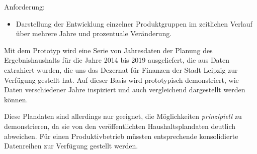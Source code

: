 \documentclass[11pt,a4paper,twoside]{article}
\begin{document}
Anforderung:
\begin{itemize}\itemsep0pt
\item Darstellung der Entwicklung einzelner Produktgruppen im zeitlichen
  Verlauf über mehrere Jahre und prozentuale Veränderung. 
\end{itemize}

Mit dem Prototyp wird eine Serie von Jahresdaten der Planung des
Ergebnishaushalts für die Jahre 2014 bis 2019 ausgeliefert, die aus Daten
extrahiert wurden, die uns das Dezernat für Finanzen der Stadt Leipzig zur
Verfügung gestellt hat.  Auf dieser Basis wird prototypisch demonstriert, wie
Daten verschiedener Jahre inspiziert und auch vergleichend dargestellt werden
können.

Diese Plandaten sind allerdings nur geeignet, die Möglichkeiten
\emph{prinzipiell} zu demonstrieren, da sie von den veröffentlichten
Haushaltsplandaten deutlich abweichen.  Für einen Produktivbetrieb müssten
entsprechende konsolidierte Datenreihen zur Verfügung gestellt werden. 
\end{document}
